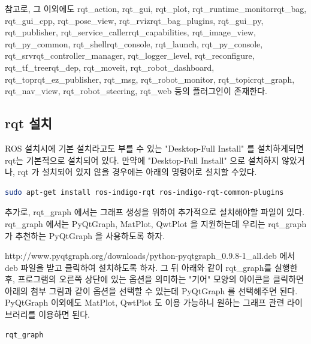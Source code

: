 참고로, 그 이외에도 rqt\_action, rqt\_gui, rqt\_plot, rqt\_runtime\_monitorrqt\_bag, rqt\_gui\_cpp, rqt\_pose\_view, rqt\_rvizrqt\_bag\_plugins, rqt\_gui\_py, rqt\_publisher, rqt\_service\_callerrqt\_capabilities, rqt\_image\_view, rqt\_py\_common, rqt\_shellrqt\_console, rqt\_launch, rqt\_py\_console, rqt\_srvrqt\_controller\_manager, rqt\_logger\_level, rqt\_reconfigure, rqt\_tf\_treerqt\_dep, rqt\_moveit, rqt\_robot\_dashboard, rqt\_toprqt\_ez\_publisher, rqt\_msg, rqt\_robot\_monitor, rqt\_topicrqt\_graph, rqt\_nav\_view, rqt\_robot\_steering, rqt\_web 등의 플러그인이 존재한다.\sloppy

\subsection{rqt 설치}

ROS 설치시에 기본 설치라고도 부를 수 있는 "Desktop-Full Install" 를 설치하게되면 rqt는 기본적으로 설치되어 있다. 만약에 "Desktop-Full Install" 으로 설치하지 않았거나, rqt 가 설치되어 있지 않을 경우에는 아래의 명령어로 설치할 수있다.

\begin{lstlisting}[language=bash]
sudo apt-get install ros-indigo-rqt ros-indigo-rqt-common-plugins
\end{lstlisting}

추가로, rqt\_graph 에서는 그래프 생성을 위하여 추가적으로 설치해야할 파일이 있다. rqt\_graph 에서는 PyQtGraph, MatPlot, QwtPlot 을 지원하는데 우리는 rqt\_graph 가 추천하는 PyQtGraph 을 사용하도록 하자.

http://www.pyqtgraph.org/downloads/python-pyqtgraph\_0.9.8-1\_all.deb 에서 deb 파일을 받고 클릭하여 설치하도록 하자. 그 뒤 아래와 같이 rqt\_graph를 실행한 후, 프로그램의 오른쪽 상단에 있는 옵션을 의미하는 "기어" 모양의 아이콘을 클릭하면 아래의 첨부 그림과 같이 옵션을 선택할 수 있는데 PyQtGraph 를 선택해주면 된다. PyQtGraph 이외에도 MatPlot, QwtPlot 도 이용 가능하니 원하는 그래프 관련 라이브러리를 이용하면 된다.

\begin{lstlisting}[language=bash]
rqt_graph
\end{lstlisting}

